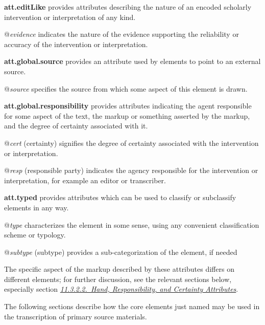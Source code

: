 \begin{sansreflist}
  
\item [\textbf{att.editLike}] provides attributes describing the nature of an encoded scholarly intervention or interpretation of any kind.\hfil\\[-10pt]\begin{sansreflist}
    \item[@{\itshape evidence}]
  indicates the nature of the evidence supporting the reliability or accuracy of the intervention or interpretation.
\end{sansreflist}  
\item [\textbf{att.global.source}] provides an attribute used by elements to point to an external source.\hfil\\[-10pt]\begin{sansreflist}
    \item[@{\itshape source}]
  specifies the source from which some aspect of this element is drawn.
\end{sansreflist}  
\item [\textbf{att.global.responsibility}] provides attributes indicating the agent responsible for some aspect of the text, the markup or something asserted by the markup, and the degree of certainty associated with it.\hfil\\[-10pt]\begin{sansreflist}
    \item[@{\itshape cert}]
  (certainty) signifies the degree of certainty associated with the intervention or interpretation.
    \item[@{\itshape resp}]
  (responsible party) indicates the agency responsible for the intervention or interpretation, for example an editor or transcriber.
\end{sansreflist}  
\item [\textbf{att.typed}] provides attributes which can be used to classify or subclassify elements in any way.\hfil\\[-10pt]\begin{sansreflist}
    \item[@{\itshape type}]
  characterizes the element in some sense, using any convenient classification scheme or typology.
    \item[@{\itshape subtype}]
  (subtype) provides a sub-categorization of the element, if needed
\end{sansreflist}  
\end{sansreflist}
 The specific aspect of the markup described by these attributes differs on different elements; for further discussion, see the relevant sections below, especially section \textit{\hyperref[PHHR]{11.3.2.2.\ Hand, Responsibility, and Certainty Attributes}}.\par
The following sections describe how the core elements just named may be used in the transcription of primary source materials. 
